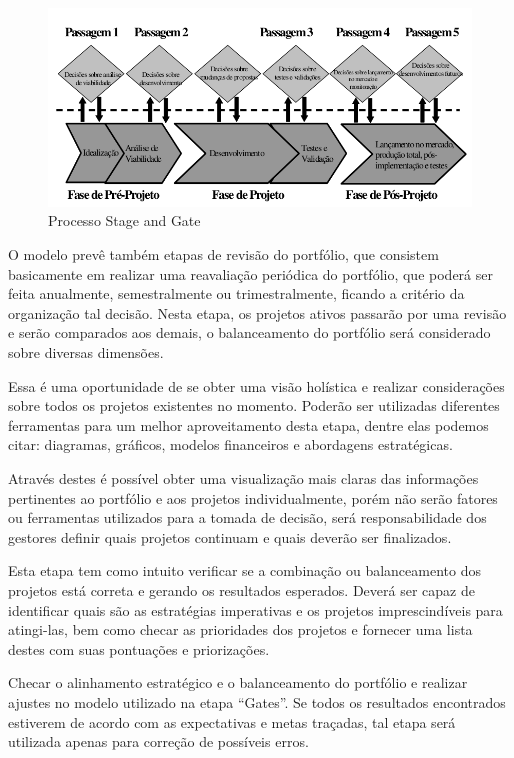 \documentclass[12pt,a4paper,ruledheader,tocpage=prefix,floatnumber=continuous,pagestart=folhaderosto,font=times]{abnt}
\begin{document}
\begin{figure}[H]
\centering
\includegraphics[width=.9\textwidth]{stage_and_gate.png}
\caption{Processo Stage and Gate}
\end{figure}

O modelo prevê também etapas de revisão do portfólio, que consistem basicamente em realizar uma reavaliação periódica do portfólio, que poderá ser feita
anualmente, semestralmente ou trimestralmente, ficando a critério da organização tal decisão. Nesta etapa, os projetos ativos passarão por uma revisão
e serão comparados aos demais, o balanceamento do portfólio será considerado sobre diversas dimensões. 

Essa é uma oportunidade de se obter uma visão holística e realizar considerações sobre todos os projetos existentes no momento. Poderão ser utilizadas 
diferentes ferramentas para um melhor aproveitamento desta etapa, dentre elas podemos citar: diagramas, gráficos, modelos financeiros e abordagens 
estratégicas. 

Através destes é possível obter uma visualização mais claras das informações pertinentes ao portfólio e aos projetos individualmente, 
porém não serão fatores ou ferramentas utilizados para a tomada de decisão, será responsabilidade dos gestores definir quais projetos continuam e quais 
deverão ser finalizados.

Esta etapa tem como intuito verificar se a combinação ou balanceamento dos projetos está correta e gerando os resultados esperados. Deverá ser capaz de
identificar quais são as estratégias imperativas e os projetos imprescindíveis para atingi-las, bem como checar as prioridades dos projetos e fornecer uma
lista destes com suas pontuações e priorizações. 

Checar o alinhamento estratégico e o balanceamento do portfólio e realizar ajustes no modelo utilizado na etapa ``Gates''. Se todos os resultados 
encontrados estiverem de acordo com as expectativas e metas traçadas, tal etapa será utilizada apenas para correção de possíveis erros. 
\end{document}
